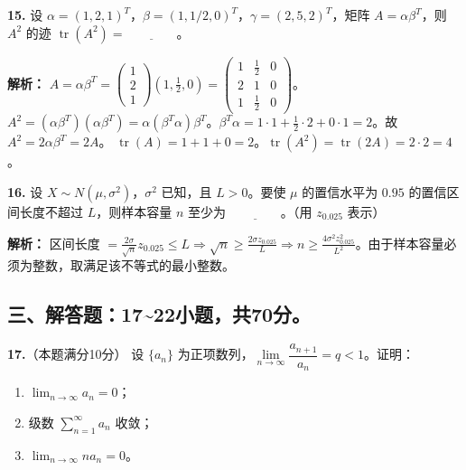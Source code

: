 \textbf{15.} 设 $\alpha=(1,2,1)^T$，$\beta=(1,1/2,0)^T$，$\gamma=(2,5,2)^T$，矩阵 $A=\alpha\beta^T$，则 $A^2$ 的迹 $\operatorname{tr}(A^2) = \underline{\qquad\qquad}$。

\ifshowsolutions\par\noindent\textbf{解析：} $A=\alpha\beta^T = \begin{pmatrix}1\\2\\1\end{pmatrix}(1,\frac12,0) = \begin{pmatrix}1&\frac12&0\\2&1&0\\1&\frac12&0\end{pmatrix}$。
$A^2 = (\alpha\beta^T)(\alpha\beta^T) = \alpha(\beta^T\alpha)\beta^T$。$\beta^T\alpha = 1\cdot1 + \frac12\cdot2 + 0\cdot1 = 2$。故 $A^2 = 2\alpha\beta^T = 2A$。
$\operatorname{tr}(A) = 1+1+0 = 2$。$\operatorname{tr}(A^2) = \operatorname{tr}(2A) = 2\cdot2 = 4$。\else \answerarea \fi

\vspace{8pt}

\textbf{16.} 设 $X\sim N(\mu,\sigma^2)$，$\sigma^2$ 已知，且 $L>0$。要使 $\mu$ 的置信水平为 $0.95$ 的置信区间长度不超过 $L$，则样本容量 $n$ 至少为 $\underline{\qquad\qquad}$。（用 $z_{0.025}$ 表示）

\ifshowsolutions\par\noindent\textbf{解析：} 区间长度 $= \frac{2\sigma}{\sqrt{n}}z_{0.025} \leqslant L \Rightarrow \sqrt{n} \geqslant \frac{2\sigma z_{0.025}}{L} \Rightarrow n \geqslant \frac{4\sigma^2 z_{0.025}^2}{L^2}$。由于样本容量必须为整数，取满足该不等式的最小整数。
\else \answerarea \fi

\newpage

\subsection*{三、解答题：17\textasciitilde22小题，共70分。}

\textbf{17.}（本题满分10分）
设 $\{a_n\}$ 为正项数列，$\lim\limits_{n\to\infty}\dfrac{a_{n+1}}{a_n}=q<1$。证明：
\begin{enumerate}
    \item[(1)] $\displaystyle\lim_{n\to\infty}a_n=0$；
    \item[(2)] 级数 $\displaystyle\sum_{n=1}^{\infty}a_n$ 收敛；
    \item[(3)] $\displaystyle\lim_{n\to\infty}n a_n=0$。
\end{enumerate}

